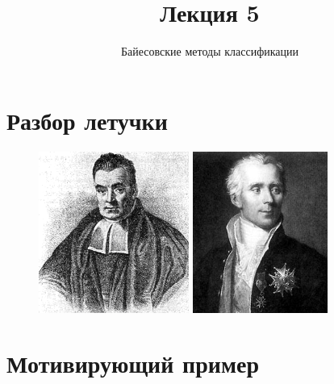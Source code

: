 \documentclass[10pt]{beamer}
\title{Лекция 5}
\subtitle{Байесовские методы классификации}
\begin{document}
\section{Разбор летучки}

\maketitle

\begin{frame}{}
	\centering
	\begin{figure}
		\begin{minipage}{.5\textwidth}
		  \includegraphics[width=0.9 \linewidth, height=150pt, keepaspectratio]{images/bayes}
		\end{minipage}%
		\begin{minipage}{.5\textwidth}				
			\includegraphics[width=0.9 \linewidth, height=150pt, keepaspectratio]{images/laplace}
		\end{minipage}
	\end{figure}
\end{frame}

\section{Мотивирующий пример}
\end{document}
